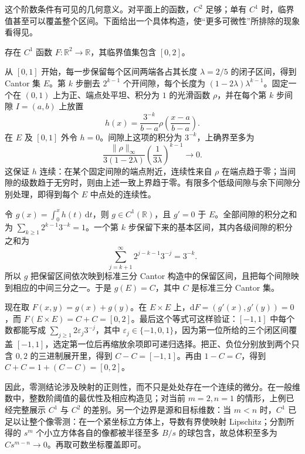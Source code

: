 \ProseParagraphBreak

这个阶数条件有可见的几何意义。对平面上的函数，\(C^2\) 足够；单有 \(C^1\) 时，临界值甚至可以覆盖整个区间。下面给出一个具体构造，使“更多可微性”所排除的现象看得见。

\begin{example}\label{g2:exm:sard-c1-counterexample}
	存在 \(C^1\) 函数 \(F:\mathbb R^2\to\mathbb R\)，其临界值集包含 \([0,2]\)。

	从 \([0,1]\) 开始，每一步保留每个区间两端各占其长度 \(\lambda=2/5\) 的闭子区间，得到 Cantor 集 \(E\)。第 \(k\) 步删去 \(2^{k-1}\) 个开间隙，每个长度为 \((1-2\lambda)\lambda^{k-1}\)。固定一个在 \((0,1)\) 上为正、端点处平坦、积分为 \(1\) 的光滑函数 \(\rho\)，并在每个第 \(k\) 步间隙 \(I=(a,b)\) 上放置
	\[
		h(x)=\frac{3^{-k}}{b-a}\rho\left(\frac{x-a}{b-a}\right).
	\]
	在 \(E\) 及 \([0,1]\) 外令 \(h=0\)。间隙上这项的积分为 \(3^{-k}\)，上确界至多为
	\[
		\frac{\|\rho\|_\infty}{3(1-2\lambda)}
		\left(\frac1{3\lambda}\right)^{k-1}\longrightarrow0.
	\]
	这保证 \(h\) 连续：在某个固定间隙的端点附近，连续性来自 \(\rho\) 在端点趋于零；当间隙的级数趋于无穷时，则由上述一致上界趋于零。有限多个低级间隙与余下间隙分别处理，即得到每个 \(E\) 中点处的连续性。

	令 \(g(x)=\int_0^xh(t)\,\mathrm{d}t\)，则 \(g\in C^1(\mathbb R)\)，且 \(g'=0\) 于 \(E\)。全部间隙的积分之和为 \(\sum_{k\ge1}2^{k-1}3^{-k}=1\)。一个第 \(k\) 步保留下来的基本区间，其内各级间隙的积分之和为
	\[
		\sum_{j=k+1}^{\infty}2^{j-k-1}3^{-j}=3^{-k}.
	\]
	所以 \(g\) 把保留区间依次映到标准三分 Cantor 构造中的保留区间，且把每个间隙映到相应的中间三分之一。于是 \(g(E)=C\)，其中 \(C\) 是标准三分 Cantor 集。

	现在取 \(F(x,y)=g(x)+g(y)\)。在 \(E\times E\) 上，\(\mathrm{d}F=(g'(x),g'(y))=0\)，而 \(F(E\times E)=C+C=[0,2]\)。最后这个等式可这样验证：\([-1,1]\) 中每个数都能写成 \(\sum_{j\ge1}2\varepsilon_j3^{-j}\)，其中 \(\varepsilon_j\in\{-1,0,1\}\)，因为第一位所给的三个闭区间覆盖 \([-1,1]\)，选定第一位后再缩放余项即可递归选择。把正、负位分别放到两个只含 \(0,2\) 的三进制展开里，得到 \(C-C=[-1,1]\)。再由 \(1-C=C\)，得到 \(C+C=1+(C-C)=[0,2]\)。
\end{example}

因此，零测结论涉及映射的正则性，而不只是处处存在一个连续的微分。在一般维数中，整数阶阈值的最优性及相应构造见\cite[第890页，第8节]{Sard1942}；对当前 \(m=2,n=1\) 的情形，上例已经完整展示 \(C^1\) 与 \(C^2\) 的差别。另一个边界是源和目标维数：当 \(m<n\) 时，\(C^1\) 已足以让整个像零测：在一个紧坐标立方体上，导数有界使映射 Lipschitz；分割所得的 \(s^m\) 个小立方体各自的像都被半径至多 \(B/s\) 的球包含，故总体积至多为 \(Cs^{m-n}\to0\)。再取可数坐标覆盖即可。
